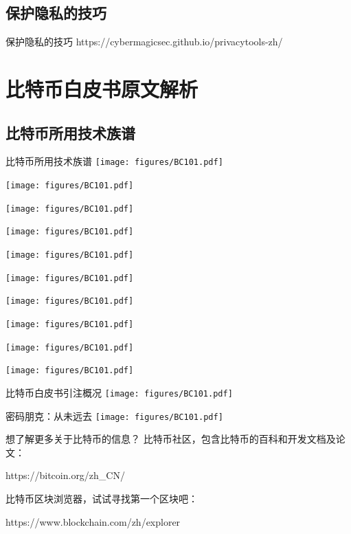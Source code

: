 \documentclass[11pt]{beamer}
\begin{document}
\subsection{保护隐私的技巧}
	
	\begin{frame}{保护隐私的技巧}
		\centering
		https://cybermagicsec.github.io/privacytools-zh/
	\end{frame}

\section{比特币白皮书原文解析}

\subsection{比特币所用技术族谱}

\begin{frame}[allowframebreaks]{比特币所用技术族谱}
	\centering
	\texttt{[image: figures/BC101.pdf]}
	
	\texttt{[image: figures/BC101.pdf]}
	
	\texttt{[image: figures/BC101.pdf]}
	
	\texttt{[image: figures/BC101.pdf]}
	
	\texttt{[image: figures/BC101.pdf]}
	
	\texttt{[image: figures/BC101.pdf]}
	
	\texttt{[image: figures/BC101.pdf]}
	
	\texttt{[image: figures/BC101.pdf]}
	
	\texttt{[image: figures/BC101.pdf]}
	
	\texttt{[image: figures/BC101.pdf]}
\end{frame}

\begin{frame}{比特币白皮书引注概况}
	\centering
	\texttt{[image: figures/BC101.pdf]}
\end{frame}

\begin{frame}{密码朋克：从未远去}
	\centering
	\texttt{[image: figures/BC101.pdf]}
\end{frame}

%	





\begin{frame}{想了解更多关于比特币的信息？}
	\centering
比特币社区，包含比特币的百科和开发文档及论文：

https://bitcoin.org/zh\_CN/

\hfil

比特币区块浏览器，试试寻找第一个区块吧：

https://www.blockchain.com/zh/explorer

\end{frame}
\end{document}
